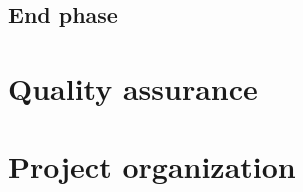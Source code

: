 \documentclass{report}
\begin{document}
	\section{End phase}\label{end_phase}
	
	
	
	
	
	\chapter{Quality assurance}\label{quality_assurance}
	
	
	
	
	
	\chapter{Project organization}
	
\end{document}
